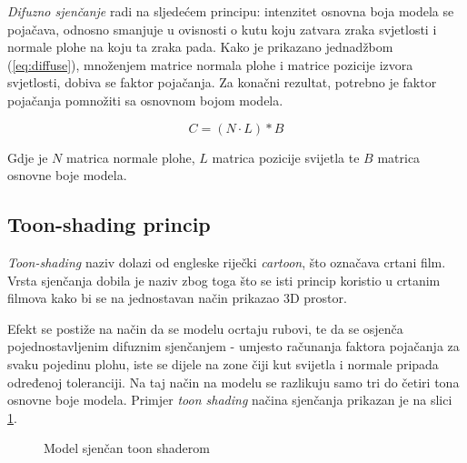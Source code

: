 \emph{Difuzno sjenčanje} radi na sljedećem principu: intenzitet osnovna boja modela se pojačava, odnosno smanjuje u ovisnosti o kutu koju zatvara zraka svjetlosti i normale plohe na koju ta zraka pada. Kako je prikazano jednadžbom (\ref{eq:diffuse}), množenjem matrice normala plohe i matrice pozicije izvora svjetlosti, dobiva se faktor pojačanja. Za konačni rezultat, potrebno je faktor pojačanja pomnožiti sa osnovnom bojom modela.

\begin{equation}
\label{eq:diffuse}
C = (N \cdot L) * B
\end{equation}

Gdje je $N$ matrica normale plohe, $L$ matrica pozicije svijetla te $B$ matrica osnovne boje modela. 

\subsection{Toon-shading princip}

\emph{Toon-shading} naziv dolazi od engleske riječki \emph{cartoon}, što označava crtani film. Vrsta sjenčanja dobila je naziv zbog toga što se isti princip koristio u crtanim filmova kako bi se na jednostavan način prikazao 3D prostor.

Efekt se postiže na način da se modelu ocrtaju rubovi, te da se osjenča pojednostavljenim difuznim sjenčanjem - umjesto računanja faktora pojačanja za svaku pojedinu plohu, iste se dijele na zone čiji kut svijetla i normale pripada određenoj toleranciji. Na taj način na modelu se razlikuju samo tri do četiri tona osnovne boje modela. Primjer \emph{toon shading} načina sjenčanja prikazan je na slici \ref{fig:monkey-toonshaded}.

\begin{figure}[H]
\centering{}
\caption{Model sjenčan toon shaderom}
\label{fig:monkey-toonshaded}
\end{figure}

